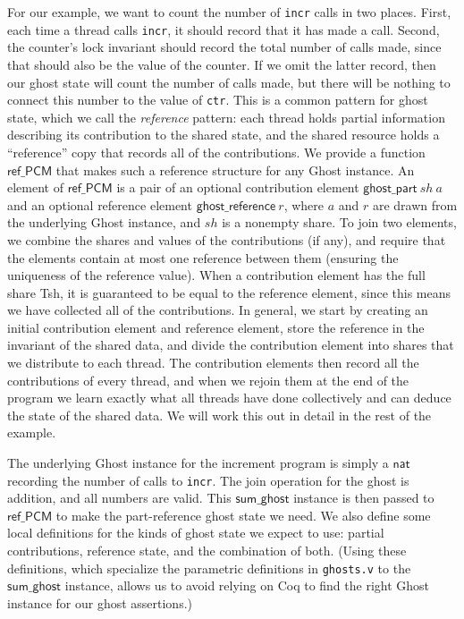 \documentclass[11pt]{article} %
\begin{document}
For our example, we want to count the number of \texttt{incr} calls in two places. First, each time a thread calls \texttt{incr}, it should record that it has made a call. Second, the counter's lock invariant should record the total number of calls made, since that should also be the value of the counter. If we omit the latter record, then our ghost state will count the number of calls made, but there will be nothing to connect this number to the value of \texttt{ctr}. This is a common pattern for ghost state, which we call the \emph{reference} pattern: each thread holds partial information describing its contribution to the shared state, and the shared resource holds a ``reference'' copy that records all of the contributions. We provide a function $\mathsf{ref\_PCM}$ that makes such a reference structure for any \textsf{Ghost} instance. An element of $\mathsf{ref\_PCM}$ is a pair of an optional contribution element $\mathsf{ghost\_part}\ \mathit{sh}\ a$ and an optional reference element $\mathsf{ghost\_reference}\ r$, where $a$ and $r$ are drawn from the underlying \textsf{Ghost} instance, and $\mathit{sh}$ is a nonempty share. To join two elements, we combine the shares and values of the contributions (if any), and require that the elements contain at most one reference between them (ensuring the uniqueness of the reference value). When a contribution element has the full share \textsf{Tsh}, it is guaranteed to be equal to the reference element, since this means we have collected all of the contributions. In general, we start by creating an initial contribution element and reference element, store the reference in the invariant of the shared data, and divide the contribution element into shares that we distribute to each thread. The contribution elements then record all the contributions of every thread, and when we rejoin them at the end of the program we learn exactly what all threads have done collectively and can deduce the state of the shared data. We will work this out in detail in the rest of the example.

The underlying \textsf{Ghost} instance for the increment program is simply a $\mathsf{nat}$ recording the number of calls to \texttt{incr}. The join operation for the ghost is addition, and all numbers are valid. This $\mathsf{sum\_ghost}$ instance is then passed to $\mathsf{ref\_PCM}$ to make the part-reference ghost state we need. We also define some local definitions for the kinds of ghost state we expect to use: partial contributions, reference state, and the combination of both. (Using these definitions, which specialize the parametric definitions in \texttt{ghosts.v} to the $\mathsf{sum\_ghost}$ instance, allows us to avoid relying on Coq to find the right \textsf{Ghost} instance for our ghost assertions.)
\end{document}
